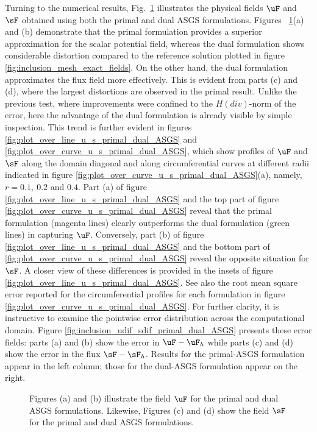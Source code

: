 Turning to the numerical results, Fig.~\ref{fig:inclusion_u_s_primal_dual_ASGS} illustrates
the physical fields $\uF$ and $\sF$ obtained using both the primal and dual ASGS formulations.
Figures ~\ref{fig:inclusion_u_s_primal_dual_ASGS}(a) and (b) demonstrate that the primal
formulation provides a superior approximation for the scalar potential field, whereas the dual 
formulation shows considerable distortion compared to the reference solution plotted in figure 
\ref{fig:inclusion_mesh_exact_fields}. On the other hand, the dual formulation approximates the 
flux field more effectively. This is evident from parts (c) and (d), where the largest distortions 
are observed in the primal result. Unlike the previous test, where improvements were confined to 
the $H(div)$-norm of the error, here the advantage of the dual formulation is already visible by 
simple inspection. This trend is further evident in figures
\ref{fig:plot_over_line_u_s_primal_dual_ASGS} and \ref{fig:plot_over_curve_u_s_primal_dual_ASGS}, 
which show profiles of $\uF$ and $\sF$ along the domain diagonal and along circumferential curves 
at different radii indicated in figure \ref{fig:plot_over_curve_u_s_primal_dual_ASGS}(a), namely, $r=0.1,~0.2$ 
and $0.4$. Part (a) of figure \ref{fig:plot_over_line_u_s_primal_dual_ASGS} and the top 
part of figure \ref{fig:plot_over_curve_u_s_primal_dual_ASGS} reveal
that the primal formulation (magenta lines) clearly outperforms the
dual formulation (green lines) in capturing $\uF$. Conversely, part (b) of figure \ref{fig:plot_over_line_u_s_primal_dual_ASGS} and the bottom part of
\ref{fig:plot_over_curve_u_s_primal_dual_ASGS} reveal the opposite situation for $\sF$. 
A closer view of these differences is provided in the insets of figure \ref{fig:plot_over_line_u_s_primal_dual_ASGS}.
See also the root mean square error reported for the circumferential profiles for each formulation
in figure \ref{fig:plot_over_curve_u_s_primal_dual_ASGS}. 
For further clarity, it is instructive to examine the pointwise error distribution across the
computational domain. Figure \ref{fig:inclusion_udif_sdif_primal_dual_ASGS} presents these error
fields: parts (a) and (b) show the error in $\uF - \uF_h$ while parts (c) and (d) show the
error in the flux $\sF - \sF_h$. Results for the primal-ASGS formulation appear in the left column; those for the
dual-ASGS formulation appear on the right.
\begin{figure}[ht!!]
	\centering
	\caption{Figures (a) and (b) illustrate the field $\uF$ for the primal and dual ASGS formulations. Likewise, Figures (c) and (d) show the field $\sF$ for the primal and dual ASGS formulations.}
	\fontsize{12pt}{10pt}\selectfont 
	\def\svgwidth{1.0\columnwidth}
	
	\label{fig:inclusion_u_s_primal_dual_ASGS}
\end{figure}

